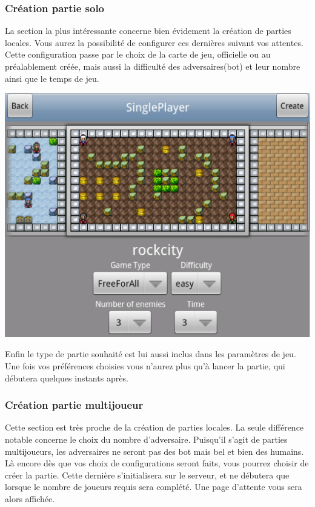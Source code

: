 	\subsubsection{Création partie solo}
	La section la plus intéressante concerne bien évidement la création de parties
	locales. Vous aurez la possibilité de configurer ces dernières suivant vos
	attentes. Cette configuration passe par le choix de la carte de jeu, officielle
	ou au préalablement créée, mais aussi la difficulté des adversaires(\gls{bot})
	et leur nombre ainsi que le temps de jeu.
		\begin{center}						
			\includegraphics[scale=0.4]{Developpement/Img/7.eps}
		\end{center} 
	Enfin le type de partie souhaité est lui
	aussi inclus dans les paramètres de jeu. Une fois vos préférences choisies
	vous n'aurez plus qu'à lancer la partie, qui débutera quelques instants après.
	
	
	\subsubsection{Création partie multijoueur}
	Cette section est très proche de la création de parties locales. La seule
	différence notable concerne le choix du nombre d'adversaire. Puisqu'il s'agit
	de parties multijoueurs, les adversaires ne seront pas des \gls{bot} mais bel
	et bien des humains. 
	Là encore dès que vos choix de configurations seront faits, vous pourrez
	choisir de créer la partie. Cette dernière s'initialisera sur le serveur, et ne
	débutera que lorsque le nombre de joueurs requis sera complété. Une page
	d'attente vous sera alors affichée.
	
